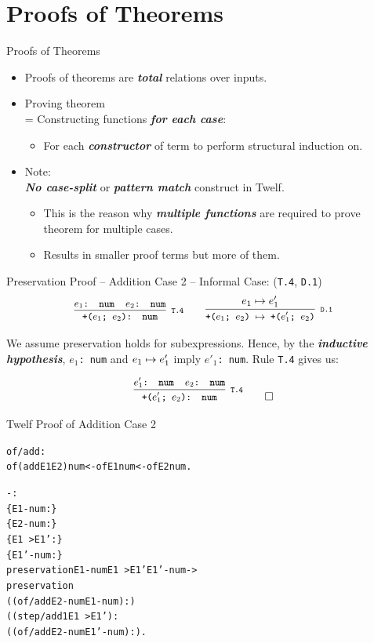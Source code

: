 \documentclass{beamer}
\renewcommand{\emph}[1]{\textbf{\textit{#1}}}
\begin{document}
\section{Proofs of Theorems}

\begin{frame}{Proofs of Theorems}
\begin{itemize}
\item Proofs of theorems are \emph{total} relations over inputs.
\item Proving theorem \\
= Constructing functions \emph{for each case}:
  \begin{itemize}
  \item For each \emph{constructor} of term to perform structural
  induction on.
  \end{itemize}

\pause
\item Note: \\
\emph{No case-split} or \emph{pattern match} construct in Twelf.
  \begin{itemize}
  \item This is the reason why \emph{multiple functions} are
  required to prove theorem for multiple cases.
  \item Results in smaller proof terms but more of them.
  \end{itemize}
\end{itemize}
\end{frame}


\begin{frame}{Preservation Proof -- Addition Case 2 -- Informal}
Case: (\texttt{T.4}, \texttt{D.1})
\[
\cinfer[T.4]{+($e_1$; $e_2$): num}
  {\code{$e_1$: num} & \code{$e_2$: num}}
\qquad
\cinfer[D.1]{+($e_1$; $e_2$) $\stepto$ +($e'_1$; $e_2$)}{e_1 \stepto e'_1}
\]

We assume preservation holds for subexpressions.
Hence, by the \emph{inductive hypothesis},
\texttt{$e_1$: num} and $e_1 \mapsto e'_1$ imply
\texttt{$e'_1$: num}.
Rule \texttt{T.4} gives us:

\[
\cinfer[T.4]{+($e'_1$; $e_2$): num}
  {\code{$e'_1$: num} & \code{$e_2$: num}}
\qed
\]
\end{frame}


\begin{frame}[containsverbatim]{Twelf Proof of Addition Case 2}
\begin{alltt}
of/add :
    of (add E1 E2) num <- of E1 num <- of E2 num.

- :
\{E1-num  :  \}
\{E2-num  :  \}
\{E1~>E1' :  \}
\{E1'-num :  \}
preservation E1-num E1~>E1' E1'-num ->
 preservation
  ((of/add E2-num E1-num) : )
  ((step/add1 E1~>E1') :
  ((of/add E2-num E1'-num) : ).
\end{alltt}
\end{frame}
\end{document}

